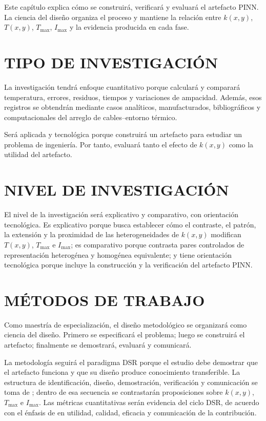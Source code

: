 \documentclass[11pt,a4paper,oneside]{report}
\newcommand{\Tmax}{T_{\max}}
\newcommand{\Imax}{I_{\max}}
\newcommand{\kx}{k(x,y)}
\begin{document}
Este capítulo explica cómo se construirá, verificará y evaluará el artefacto PINN. La ciencia del diseño organiza el proceso y mantiene la relación entre $\kx$, $T(x,y)$, $\Tmax$, $\Imax$ y la evidencia producida en cada fase.

\section{TIPO DE INVESTIGACIÓN}
\label{sec:metodologia}

La investigación tendrá enfoque cuantitativo porque calculará y comparará temperatura, errores, residuos, tiempos y variaciones de ampacidad. Además, esos registros se obtendrán mediante casos analíticos, manufacturados, bibliográficos y computacionales del arreglo de cables--entorno térmico.

Será aplicada y tecnológica porque construirá un artefacto para estudiar un problema de ingeniería. Por tanto, evaluará tanto el efecto de $\kx$ como la utilidad del artefacto.

\section{NIVEL DE INVESTIGACIÓN}

El nivel de la investigación será explicativo y comparativo, con orientación tecnológica. Es explicativo porque busca establecer cómo el contraste, el patrón, la extensión y la proximidad de las heterogeneidades de $\kx$ modifican $T(x,y)$, $\Tmax$ e $\Imax$; es comparativo porque contrasta pares controlados de representación heterogénea y homogénea equivalente; y tiene orientación tecnológica porque incluye la construcción y la verificación del artefacto PINN.

\section{MÉTODOS DE TRABAJO}

Como maestría de especialización, el diseño metodológico se organizará como ciencia del diseño. Primero se especificará el problema; luego se construirá el artefacto; finalmente se demostrará, evaluará y comunicará.

La metodología seguirá el paradigma DSR porque el estudio debe demostrar que el artefacto funciona y que su diseño produce conocimiento transferible. La estructura de identificación, diseño, demostración, verificación y comunicación se toma de \textcite[55--56]{peffers2007}; dentro de esa secuencia se contrastarán proposiciones sobre $\kx$, $\Tmax$ e $\Imax$. Las métricas cuantitativas serán evidencia del ciclo DSR, de acuerdo con el énfasis de \textcite[349--351]{gregor2013} en utilidad, calidad, eficacia y comunicación de la contribución. 
\end{document}
